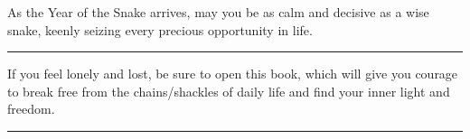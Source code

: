 \documentclass[11pt,a4paper]{article}
\newcommand{\num}[1]{\makebox[1.9em][r]{#1.}\hspace{0.3em}}
\newcommand{\wline}{\noindent\rule{\linewidth}{0.4pt}}
\begin{document}
\begin{minipage}{\linewidth}

\num{19}As the Year of the Snake arrives, may you be as calm and decisive as a wise snake, keenly seizing every precious opportunity in life.

\vspace{0.25em}

\wline

\end{minipage}

\begin{minipage}{\linewidth}

\num{20}If you feel lonely and lost, be sure to open this book, which will give you courage to break free from the chains/shackles of daily life and find your inner light and freedom.

\vspace{0.25em}

\wline

\end{minipage}
\end{document}
